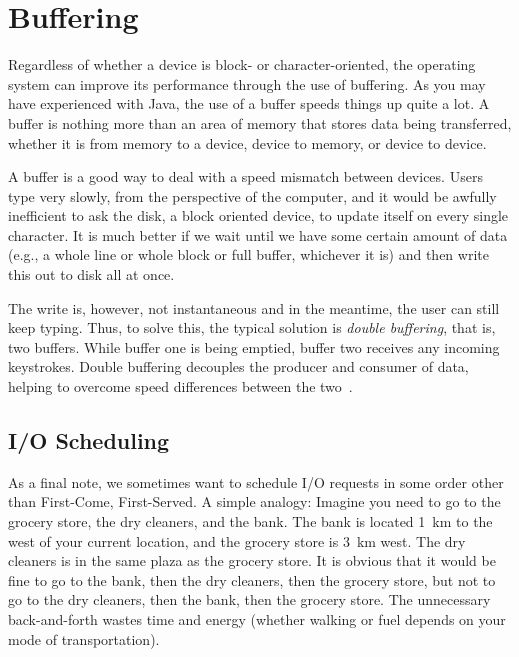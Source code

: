 




\section*{Buffering}

Regardless of whether a device is block- or character-oriented, the operating system can improve its performance through the use of buffering. As you may have experienced with Java, the use of a buffer speeds things up quite a lot. A buffer is nothing more than an area of memory that stores data being transferred, whether it is from memory to a device, device to memory, or device to device. 

A buffer is a good way to deal with a speed mismatch between devices. Users type very slowly, from the perspective of the computer, and it would be awfully inefficient to ask the disk, a block oriented device, to update itself on every single character. It is much better if we wait until we have some certain amount of data (e.g., a whole line or whole block or full buffer, whichever it is) and then write this out to disk all at once. 

The write is, however, not instantaneous and in the meantime, the user can still keep typing. Thus, to solve this, the typical solution is \textit{double buffering}, that is, two buffers. While buffer one is being emptied, buffer two receives any incoming keystrokes. Double buffering decouples the producer and consumer of data, helping to overcome speed differences between the two~\cite{osc}.




\subsection*{I/O Scheduling}

As a final note, we sometimes want to schedule I/O requests in some order other than First-Come, First-Served. A simple analogy: Imagine you need to go to the grocery store, the dry cleaners, and the bank. The bank is located 1~km to the west of your current location, and the grocery store is 3~km west. The dry cleaners is in the same plaza as the grocery store. It is obvious that it would be fine to go to the bank, then the dry cleaners, then the grocery store, but not to go to the dry cleaners, then the bank, then the grocery store. The unnecessary back-and-forth wastes time and energy (whether walking or fuel depends on your mode of transportation).

